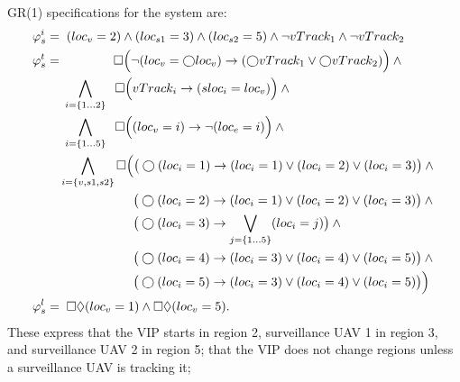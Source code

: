 \documentclass[runningheads]{llncs}
\begin{document}
GR(1) specifications for the system are:
\small
\begin{align}
\varphi_s^i  = & \;\; (loc_v = 2) \land (loc_{s1} = 3) \land (loc_{s2} = 5) \land \lnot vTrack_1 \land \lnot vTrack_2 \label{eq:vipSysInit} \\
\varphi_s^t  =  & \quad\quad\quad\quad\; \square \Big( \lnot(loc_v = \varbigcirc loc_v) \rightarrow (\varbigcirc vTrack_1 \lor \varbigcirc vTrack_2) \Big)  \land \mbox{} \label{eq:vipNoMoveUnlessTracked} \\
 & \;  \bigwedge_{i = \{1 \ldots 2\}} \;\;   \square \Big(vTrack_i \rightarrow (sloc_i = loc_v)\Big) \land \mbox{} \label{eq:vipSysVtrack} \\
& \; \bigwedge_{i = \{1 \ldots 5\}} \;\;   \square \Big((loc_v = i) \rightarrow \lnot(loc_e = i)\Big) \land \mbox{} \label{eq:vipSysNoEloc} \\
 & \bigwedge_{i = \{v, s1, s2\}} \square \Big(\big( \varbigcirc(loc_i = 1) \rightarrow (loc_i = 1) \lor (loc_i = 2) \lor (loc_i = 3)   \big) \land \mbox{} \label{eq:vipSysTrans1} \\
 & \quad\quad\quad\quad\quad\;\;\; \big(\varbigcirc (loc_i = 2) \rightarrow (loc_i = 1) \lor (loc_i = 2) \lor (loc_i = 3)   \big) \land \mbox{} \label{eq:vipSysTrans2} \\
  & \quad\quad\quad\quad\quad\;\;\; \big(\varbigcirc (loc_i = 3) \rightarrow \bigvee_{j=\{1\ldots5\}} (loc_i = j) \big) \land \mbox{}  \label{eq:vipSysTrans3} \\
  & \quad\quad\quad\quad\quad\;\;\; \big(\varbigcirc (loc_i = 4) \rightarrow (loc_i = 3) \lor (loc_i = 4) \lor (loc_i = 5)   \big) \land \mbox{} \label{eq:vipSysTrans4} \\
  & \quad\quad\quad\quad\quad\;\;\; \big(\varbigcirc (loc_i = 5) \rightarrow (loc_i = 3) \lor (loc_i = 4) \lor (loc_i = 5)  \big)  \Big)  \label{eq:vipSysTrans5} \\
\varphi_s^l = & \;\; \square \lozenge (loc_v = 1) \land \square \lozenge (loc_v = 5). \label{eq:vipSysLiveness}
\end{align}
%
These express  that the VIP starts in region 2, surveillance UAV 1 in region 3, and surveillance UAV 2 in region 5; 
 that the VIP does not change regions unless a surveillance UAV is tracking it; 
\end{document}
